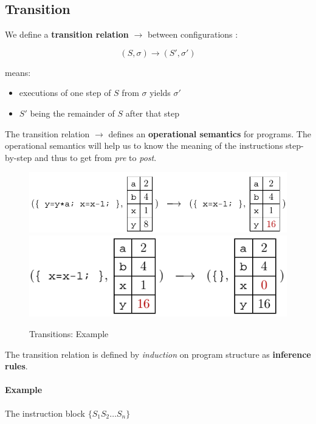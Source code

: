 \documentclass[12pt, a4paper]{book}
\begin{document}
\subsection{Transition}
\label{sub:Transition}

We define a \textbf{transition relation} $\longrightarrow$ between
configurations :

$$(S,\sigma) \longrightarrow (S',\sigma')$$

means:

\begin{itemize}
    \item executions of one step of $S$ from $\sigma$ yields $\sigma'$
    \item $S'$ being the remainder of $S$ after that step
\end{itemize}

The transition relation $\longrightarrow$ defines an \textbf{operational
semantics} for programs. The operational semantics will help us to know the
meaning of the instructions step-by-step and thus to get from \textit{pre} to
\textit{post}.

\begin{figure}[!ht]
    \centering
    \includegraphics[width=\linewidth]{transition1.png}
    \includegraphics[width=\linewidth]{transition2.png}
    \caption{Transitions: Example}
\end{figure}

The transition relation is defined by \textit{induction} on program structure as
\textbf{inference rules}. \newline

\paragraph{Example} The instruction block $\{S_1 S_2 \ldots S_n\}$
\end{document}
